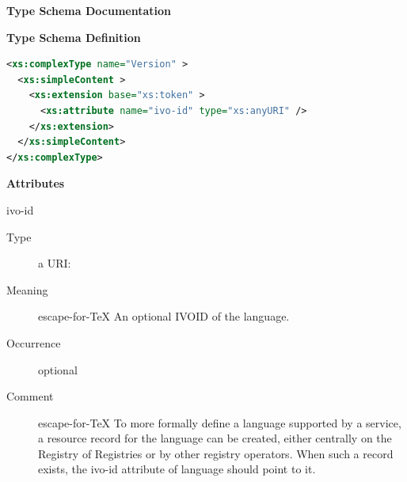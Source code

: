 \documentclass{ivoa}
\begin{document}
\endgroup

\begingroup
      	\renewcommand*\descriptionlabel[1]{%
      	\hbox to 5.5em{\emph{#1}\hfil}}\vspace{2ex}\noindent\textbf{ Type Schema Documentation}



\vspace{1ex}\noindent\textbf{ Type Schema Definition}

\begin{lstlisting}[language=XML,basicstyle=\footnotesize]
<xs:complexType name="Version" >
  <xs:simpleContent >
    <xs:extension base="xs:token" >
      <xs:attribute name="ivo-id" type="xs:anyURI" />
    </xs:extension>
  </xs:simpleContent>
</xs:complexType>
\end{lstlisting}

\vspace{0.5ex}\noindent\textbf{ Attributes}

\begingroup\small\begin{bigdescription}
\item[ivo-id]
\begin{description}
\item[Type] a URI: 
\item[Meaning] escape-for-TeX{{{
            An optional IVOID of the language.
            }}}
\item[Occurrence] optional
\item[Comment] escape-for-TeX{{{
              To more formally define a language supported by a service,
              a resource record for the language can be created, either
              centrally on the Registry of Registries or by other registry operators.  
              When such a record exists, the ivo-id attribute of language
              should point to it.
            }}}
\end{description}


\end{bigdescription}\endgroup
\end{document}
